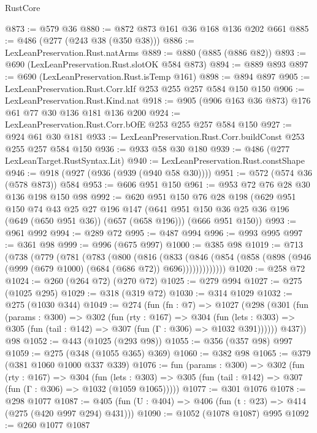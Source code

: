 \begin{lexlean}{RustCore}
\begin{coremodule}
@873 := @579 @36
@880 := @872 @873 @161 @36 @168 @136 @202 @661
@885 := @486 (@277 (@243 @38 (@350 @38)))
@886 := LexLeanPreservation.Rust.natArms
@889 := @880 (@885 (@886 @82))
@893 := @690 (LexLeanPreservation.Rust.slotOK @584 @873)
@894 := @889 @893
@897 := @690 (LexLeanPreservation.Rust.isTemp @161)
@898 := @894 @897
@905 := LexLeanPreservation.Rust.Corr.kIf @253 @255 @257 @584 @150 @150
@906 := LexLeanPreservation.Rust.Kind.nat
@918 := @905 (@906 @163 @36 @873) @176 @61 @77 @30 @136 @181 @136 @200
@924 := LexLeanPreservation.Rust.Corr.bOfE @253 @255 @257 @584 @150
@927 := @924 @61 @30 @181
@933 := LexLeanPreservation.Rust.Corr.buildConst @253 @255 @257 @584 @150
@936 := @933 @58 @30 @180
@939 := @486 (@277 LexLeanTarget.RustSyntax.Lit)
@940 := LexLeanPreservation.Rust.constShape
@946 := @918 (@927 (@936 (@939 (@940 @58 @30))))
@951 := @572 (@574 @36 (@578 @873)) @584
@953 := @606 @951 @150
@961 := @953 @72 @76 @28 @30 @136 @198 @150 @98
@992 := @620
    @951
    @150
    @76
    @28
    @198
    (@629
      @951
      @150
      @74
      @43
      @25
      @27
      @196
      @147
      (@641 @951 @150 @36 @25 @36 @196 (@649 (@650 @951 @36)) (@657 (@658 @196)))
      (@666 @951 @150))
@993 := @961 @992
@994 := @289 @72
@995 := @487 @994
@996 := @993 @995
@997 := @361 @98
@999 := @996 (@675 @997)
@1000 := @385 @98
@1019 := @713
    (@738
      (@779
        (@781
          (@783
            (@800
              (@816
                (@833
                  (@846
                    (@854 (@858 (@898 (@946 (@999 (@679 @1000) (@684 (@686 @72)) @696)))))))))))))
@1020 := @258 @72
@1024 := @260 (@264 @72) (@270 @72)
@1025 := @279 @994
@1027 := @275 (@1025 @295)
@1029 := @318 (@319 @72)
@1030 := @314 @1029
@1032 := @275 (@1030 @344)
@1049 := @274
    (fun (fn : @7) =>
    @1027
      (@298
        (@301
          (fun (params : @300) =>
          @302
            (fun (rty : @167) =>
            @304
              (fun (lets : @303) =>
              @305 (fun (tail : @142) => @307 (fun (Γ : @306) => @1032 @391))))))
        @437))
    @98
@1052 := @443 (@1025 (@293 @98))
@1055 := @356 (@357 @98) @997
@1059 := @275 (@348 (@1055 @365) @369)
@1060 := @382 @98
@1065 := @379 (@381 @1060 @1000 @337 @339)
@1076 := fun (params : @300) =>
  @302
    (fun (rty : @167) =>
    @304
      (fun (lets : @303) =>
      @305 (fun (tail : @142) => @307 (fun (Γ : @306) => @1032 (@1059 @1065)))))
@1077 := @301 @1076
@1078 := @298 @1077
@1087 := @405 (fun (U : @404) => @406 (fun (t : @23) => @414 (@275 (@420 @997 @294) @431)))
@1090 := @1052 (@1078 @1087) @995
@1092 := @260 @1077 @1087

\end{coremodule}
\end{lexlean}
